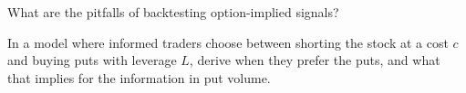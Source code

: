 \begin{interviewq}\label{iq:s1:options-implied-signals-for-stocks:5}
What are the pitfalls of backtesting option-implied signals?
\end{interviewq}

\begin{interviewq}\label{iq:s1:options-implied-signals-for-stocks:6}
In a model where informed traders choose between shorting the stock at a cost $c$ and buying puts with leverage $L$, derive when they prefer the puts, and
what that implies for the information in put volume.
\end{interviewq}
